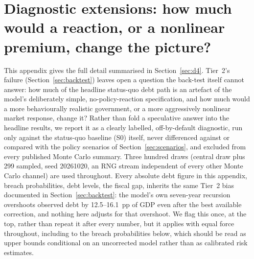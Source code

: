 \documentclass[11pt,a4paper]{article}
\begin{document}
\section{Diagnostic extensions: how much would a reaction, or a nonlinear premium, change the picture?}
\label{app:d4}

\noindent This appendix gives the full detail summarised in Section~\ref{sec:d4}. Tier~2's failure (Section~\ref{sec:backtest}) leaves open a question the back-test itself cannot answer: how much of the headline status-quo debt path is an artefact of the model's deliberately simple, no-policy-reaction specification, and how much would a more behaviourally realistic government, or a more aggressively nonlinear market response, change it? Rather than fold a speculative answer into the headline results, we report it as a clearly labelled, off-by-default diagnostic, run only against the status-quo baseline (\textsc{S0}) itself, never differenced against or compared with the policy scenarios of Section~\ref{sec:scenarios}, and excluded from every published Monte Carlo summary. Three hundred draws (central draw plus 299 sampled, seed 20261020, an RNG stream independent of every other Monte Carlo channel) are used throughout. Every absolute debt figure in this appendix, breach probabilities, debt levels, the fiscal gap, inherits the same Tier~2 bias documented in Section~\ref{sec:backtest}: the model's own seven-year recursion overshoots observed debt by 12.5--16.1~pp of GDP even after the best available correction, and nothing here adjusts for that overshoot. We flag this once, at the top, rather than repeat it after every number, but it applies with equal force throughout, including to the breach probabilities below, which should be read as upper bounds conditional on an uncorrected model rather than as calibrated risk estimates.
\end{document}
